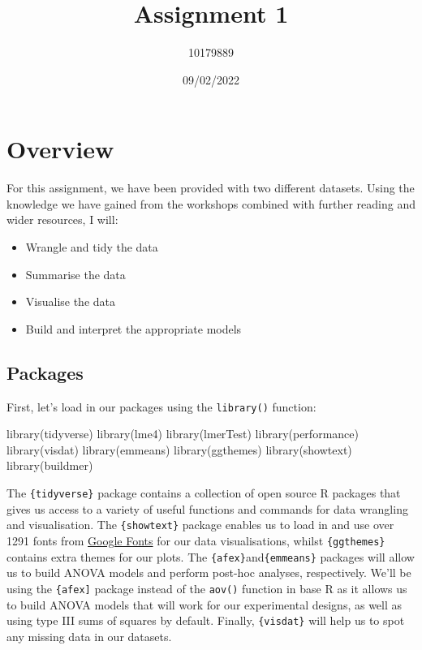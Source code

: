 \documentclass[
]{article}
\title{Assignment 1}
\author{10179889}
\date{09/02/2022}
\newenvironment{Shaded}{\begin{snugshade}}{\end{snugshade}}
\newcommand{\FunctionTok}[1]{\textcolor[rgb]{0.00,0.00,0.00}{#1}}
\newcommand{\NormalTok}[1]{#1}
\providecommand{\tightlist}{%
  \setlength{\itemsep}{0pt}\setlength{\parskip}{0pt}}
\begin{document}
\maketitle

{
\setcounter{tocdepth}{2}
\tableofcontents
}
\hypertarget{overview}{%
\section{Overview}\label{overview}}

For this assignment, we have been provided with two different datasets.
Using the knowledge we have gained from the workshops combined with
further reading and wider resources, I will:

\begin{itemize}
\tightlist
\item
  Wrangle and tidy the data
\item
  Summarise the data
\item
  Visualise the data
\item
  Build and interpret the appropriate models
\end{itemize}

\hypertarget{packages}{%
\subsection{Packages}\label{packages}}

First, let's load in our packages using the \texttt{library()} function:

\begin{Shaded}
\begin{Highlighting}[]
\FunctionTok{library}\NormalTok{(tidyverse)}
\FunctionTok{library}\NormalTok{(lme4)}
\FunctionTok{library}\NormalTok{(lmerTest)}
\FunctionTok{library}\NormalTok{(performance)}
\FunctionTok{library}\NormalTok{(visdat)}
\FunctionTok{library}\NormalTok{(emmeans)}
\FunctionTok{library}\NormalTok{(ggthemes)}
\FunctionTok{library}\NormalTok{(showtext)}
\FunctionTok{library}\NormalTok{(buildmer)}
\end{Highlighting}
\end{Shaded}

The \texttt{\{tidyverse\}} package contains a collection of open source
R packages that gives us access to a variety of useful functions and
commands for data wrangling and visualisation. The \texttt{\{showtext\}}
package enables us to load in and use over 1291 fonts from
\href{https://fonts.google.com/}{Google Fonts} for our data
visualisations, whilst \texttt{\{ggthemes\}} contains extra themes for
our plots. The \texttt{\{afex\}}and\texttt{\{emmeans\}} packages will
allow us to build ANOVA models and perform post-hoc analyses,
respectively. We'll be using the \texttt{\{afex{]}} package instead of
the \texttt{aov()} function in base R as it allows us to build ANOVA
models that will work for our experimental designs, as well as using
type III sums of squares by default. Finally, \texttt{\{visdat\}} will
help us to spot any missing data in our datasets.
\end{document}
